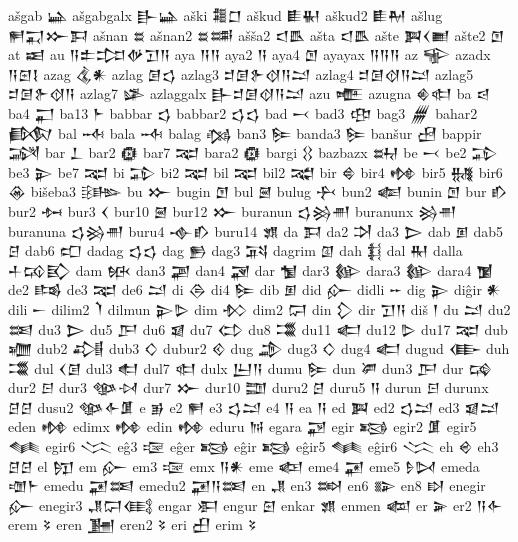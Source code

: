  ašgab  𒀿   
 ašgabgalx  𒃲𒀿    
 aški  𒍤𒆸    
 aškud  𒀾𒈽    
 aškud2  𒀾𒈹    
 ašlug  𒂍𒍑𒁍𒁕    
 ašnan  𒊺   
 ašnan2  𒊺𒌁    
 ašša2  𒃰𒋺    
 ašta  𒃰𒋺    
 ašte  𒀉𒌋𒆤    
 ašte2  𒆹   
 at  𒀜   
 au  𒀀𒉺𒄐𒉻𒋛𒀀    
 aya  𒀀𒀀    
 aya2  𒀀   
 aya4  𒆹   
 ayayax  𒀀𒀀𒀀    
 az  𒊍   
 azadx  𒀀𒇉𒋙    
 azag  𒆬𒀭    
 azlag  𒌆𒌓    
 azlag3  𒄑𒌆𒉿𒋼𒀀𒁺    
 azlag4  𒄑𒌆𒋼𒀀𒁺    
 azlag5  𒄑𒌆𒉿𒋼𒀀    
 azlag7  𒈐   
 azlaggalx  𒃲𒄑𒌆𒋼𒀀𒁺    
 azu  𒍬   
 azugna  𒄯𒊕    
 ba  𒁀   
 ba4  𒂷   
 ba13  𒈨   
 babbar  𒌓   
 babbar2  𒌓𒌓    
 bad  𒁁   
 bad3  𒂦   
 bag3  𒁂   
 bahar2  𒁃   
 bal  𒁄   
 bala  𒁄   
 balag  𒁆   
 ban3  𒌉   
 banda3  𒌉   
 banšur  𒍎   
 bappir  𒋋   
 bar  𒁇   
 bar2  𒁈   
 bar7  𒉈   
 bara2  𒁈   
 bargi  𒌐   
 bazbazx  𒊻   
 be  𒁁   
 be2  𒁉   
 be3  𒉌   
 be7  𒉈   
 bi  𒁉   
 bi2  𒉈   
 bil  𒉈   
 bil2  𒉋   
 bir  𒄵   
 bir4  𒂔   
 bir5  𒉆   
 bir6  𒊶   
 bišeba3  𒄡   
 bu  𒁍   
 bugin  𒆹   
 bul  𒇧   
 bulug  𒁑   
 bun2  𒅮   
 bunin  𒆹   
 bur  𒁓   
 bur2  𒁔   
 bur3  𒌋   
 bur10  𒇧   
 bur12  𒁍   
 buranun  𒌓𒄒𒉣    
 buranunx  𒄒𒉣    
 buranuna  𒌓𒄒𒉣    
 buru4  𒉢𒁓    
 buru14  𒂙   
 da  𒁕   
 da2  𒋫   
 da3  𒆕   
 dab  𒁳   
 dab5  𒆪   
 dab6  𒍏   
 dadag  𒌓𒌓    
 dag  𒁖   
 dag3  𒍴   
 dagrim  𒇑   
 dah  𒈭   
 dal  𒊑   
 dalla  𒈦𒄘𒃼    
 dam  𒁮   
 dan3  𒃩   
 dan4  𒃋   
 dar  𒁯   
 dar3  𒁰   
 dara3  𒁰   
 dara4  𒁱   
 de2  𒌤   
 de3  𒉈   
 de6  𒁺   
 di  𒁲   
 di4  𒌉   
 dib  𒁳   
 did  𒅎   
 didli  𒐀   
 dig  𒉌   
 diĝir  𒀭   
 dili  𒀸   
 dilim2  𒇺   
 dilmun  𒉌𒌇    
 dim  𒁴   
 dim2  𒁶   
 din  𒁷   
 dir  𒋛𒀀    
 diš  𒁹   
 du  𒁺   
 du2  𒌅   
 du3  𒆕   
 du5  𒂅   
 du6  𒇯   
 du7  𒌌   
 du8  𒂃   
 du11  𒅗   
 du12  𒌇   
 du17  𒉈   
 dub  𒁾   
 dub2  𒂀   
 dub3  𒄭   
 dubur2  𒄶   
 dug  𒂁   
 dug3  𒄭   
 dug4  𒅗   
 dugud  𒂂   
 duh  𒂃   
 dul  𒌋𒌆    
 dul3  𒊨   
 dul7  𒊕   
 dulx  𒌨𒀀       
 dumu  𒌉   
 dun  𒂄   
 dun3  𒂅   
 dur  𒄙   
 dur2  𒂉   
 dur3  𒀲𒀴    
 dur7  𒁍   
 dur10  𒊿   
 duru2  𒆪   
 duru5  𒀀   
 durun  𒂉   
 durunx  𒆪𒆪    
 dusu2  𒀲𒅆𒂠    
 e  𒂊   
 e2  𒂍   
 e3  𒌓𒁺    
 e4  𒀀   
 ea  𒀀   
 ed  𒀉   
 ed2  𒌓𒁺    
 ed3  𒇯𒁺    
 eden  𒂔   
 edimx  𒂔   
 edin  𒂔   
 eduru  𒀁   
 egara  𒃌   
 egir  𒂕   
 egir2  𒂠   
 egir5  𒈝   
 egir6  𒈱   
 eĝ3  𒉘   
 eĝer  𒂕   
 eĝir  𒂕   
 eĝir5  𒈝   
 eĝir6  𒈱   
 eh  𒄴   
 eh3  𒆪𒆪    
 el  𒂖   
 em  𒅎   
 em3  𒉘   
 emx  𒀀𒀭    
 eme  𒅴   
 eme4  𒂼   
 eme5  𒊩𒄸    
 emeda  𒌝𒈨    
 emedu  𒂼𒌅    
 emedu2  𒂼𒀀𒌅    
 en  𒂗   
 en3  𒇷   
 en6  𒅔   
 en8  𒊭   
 enegir  𒅎   
 enegir3  𒂗𒁶𒍼    
 engar  𒀳   
 engur  𒇉   
 enkar  𒂙   
 enmen  𒆉   
 er  𒅕   
 er2  𒀀𒅆    
 erem  𒂟   
 eren  𒂞   
 eren2  𒂟   
 eri  𒌷   
 erim  𒂟   
